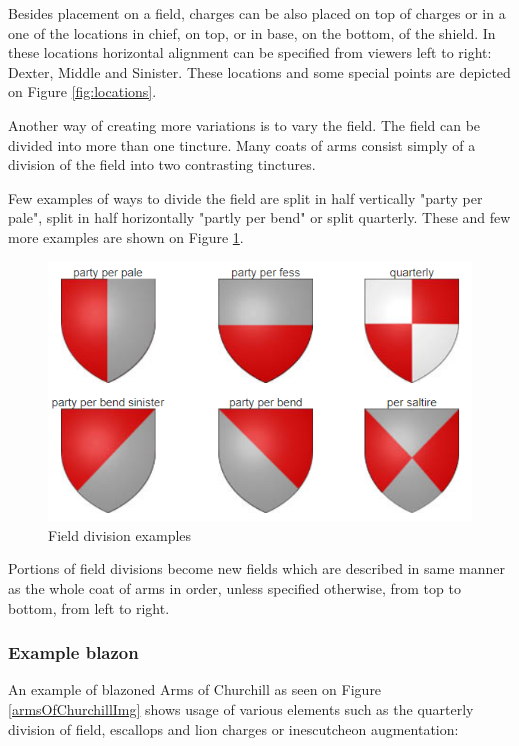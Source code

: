 \documentclass[12pt,a4paper]{article}
\begin{document}
Besides placement on a field, charges can be also placed on top of charges or in a one of the locations in chief, on top, or in base, on the bottom, of the shield.
In these locations horizontal alignment can be specified from viewers left to right: Dexter, Middle and Sinister.
These locations and some special points are depicted on Figure \ref{fig:locations}.

Another way of creating more variations is to vary the field. The field can be divided into more than one tincture.
Many coats of arms consist simply of a division of the field into two contrasting tinctures. \cite{InternationalHeraldry}

Few examples of ways to divide the field are split in half vertically "party per pale", split in half horizontally "partly per bend" or split quarterly. These and few more examples are shown on Figure \ref{fig:fielddivisions}.
\begin{figure}[h]
	\centering
	\includegraphics[width=0.60\linewidth]{img/fieldDivisions}
	\caption{Field division examples}
	\label{fig:fielddivisions}
\end{figure}

Portions of field divisions become new fields which are described in same manner as the whole coat of arms in order, unless specified otherwise, from top to bottom, from left to right.

\subsubsection{Example blazon}
An example of blazoned Arms of Churchill as seen on Figure \ref{armsOfChurchillImg} shows usage of various elements such as the quarterly division of field, escallops and lion charges or inescutcheon augmentation:
\end{document}
